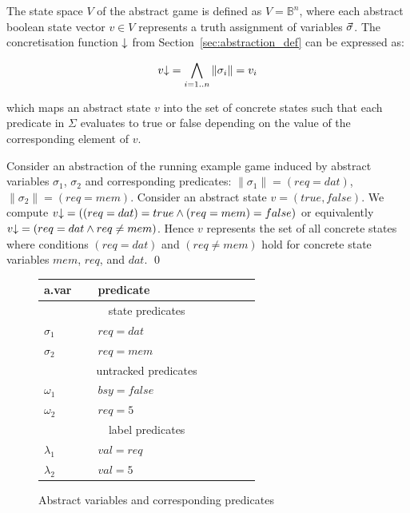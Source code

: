 The state space $V$ of the abstract game is defined as $V = \mathbb{B}^n$, where each abstract boolean state vector $v\in V$ represents a truth assignment of variables $\vec{\sigma}$. The concretisation function $\mathord{\downarrow}$ from Section~\ref{sec:abstraction_def} can be expressed as: 

\begin{equation}
v\mathord{\downarrow}=\bigwedge_{i=1..n}\|\sigma_i\|=v_i
\end{equation}

\noindent which maps an abstract state $v$ into the set of concrete states such that each predicate in $\Sigma$ evaluates to true or false depending on the value of the corresponding element of $v$.

\begin{ex}
    \everymath{\mathtt{\xdef\tmp{\fam\the\fam\relax}\aftergroup\tmp}}
    \everydisplay{\mathtt{\xdef\tmp{\fam\the\fam\relax}\aftergroup\tmp}}
    Consider an abstraction of the running example game induced by abstract variables $\sigma_1$, $\sigma_2$ and corresponding predicates: $\|\sigma_1\| = (req=dat)$, $\|\sigma_2\| = (req = mem)$.  Consider an abstract state $v=(true,false)$. We compute $v\mathord{\downarrow} = ((req=dat) = true \land (req = mem)=false)$ or equivalently $v\mathord{\downarrow} = (req=dat \land req \neq mem)$.  Hence $v$ represents the set of all concrete states where conditions $(req=dat)$ and  $(req \neq mem)$ hold for concrete state variables $mem$, $req$, and $dat$.
    \qed
\end{ex}

\begin{figure}
    \centering
    \label{fig:ex_game_abstraction}
    \caption{Abstract variables and corresponding predicates}
    \begin{tabular}{|p{0.14\linewidth}|p{0.5\linewidth}|}
        \hline
        {\bf a.var} & {\bf predicate} \\
        \hline\hline
        \multicolumn{2}{|c|}{state predicates} \\
        \hline
        $\sigma_1$ & $req=dat$   \\
        $\sigma_2$ & $req=mem$   \\
        \hline\hline
        \multicolumn{2}{|c|}{untracked predicates} \\
        \hline
        $\omega_1$ & $bsy=false$ \\
        $\omega_2$ & $req=5$     \\
        \hline\hline
        \multicolumn{2}{|c|}{label predicates} \\
        \hline
        $\lambda_1$ & $val=req$  \\
        $\lambda_2$ & $val=5$    \\
        \hline
    \end{tabular}
\end{figure}


